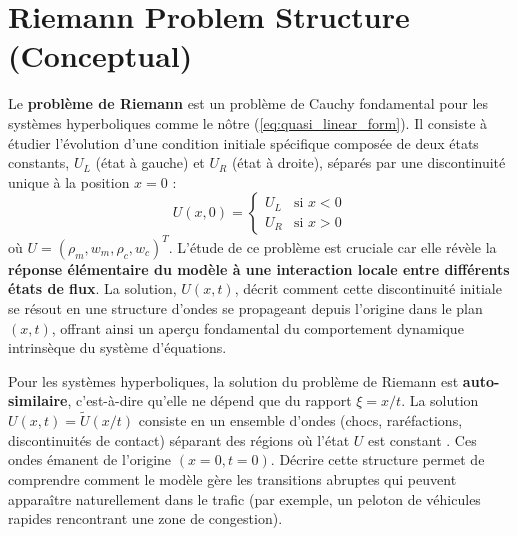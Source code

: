 \section{Riemann Problem Structure (Conceptual)}
\label{sec:riemann_problem}

Le \textbf{problème de Riemann} est un problème de Cauchy fondamental pour les systèmes hyperboliques comme le nôtre (\ref{eq:quasi_linear_form}). Il consiste à étudier l'évolution d'une condition initiale spécifique composée de deux états constants, \( U_L \) (état à gauche) et \( U_R \) (état à droite), séparés par une discontinuité unique à la position \( x = 0 \) :
\begin{equation}
    \label{eq:riemann_initial_data}
    U(x, 0) =
    \begin{cases}
        U_L & \text{si } x < 0 \\
        U_R & \text{si } x > 0
    \end{cases}
\end{equation}
où \( U = (\rho_m, w_m, \rho_c, w_c)^T \). L'étude de ce problème est cruciale car elle révèle la \textbf{réponse élémentaire du modèle à une interaction locale entre différents états de flux}. La solution, \( U(x, t) \), décrit comment cette discontinuité initiale se résout en une structure d'ondes se propageant depuis l'origine dans le plan \( (x, t) \), offrant ainsi un aperçu fondamental du comportement dynamique intrinsèque du système d'équations.

Pour les systèmes hyperboliques, la solution du problème de Riemann est \textbf{auto-similaire}, c'est-à-dire qu'elle ne dépend que du rapport \( \xi = x/t \). La solution \( U(x,t) = \tilde{U}(x/t) \) consiste en un ensemble d'ondes (chocs, raréfactions, discontinuités de contact) séparant des régions où l'état \( U \) est constant \cite{LeVeque2002}. Ces ondes émanent de l'origine \( (x=0, t=0) \). Décrire cette structure permet de comprendre comment le modèle gère les transitions abruptes qui peuvent apparaître naturellement dans le trafic (par exemple, un peloton de véhicules rapides rencontrant une zone de congestion).

